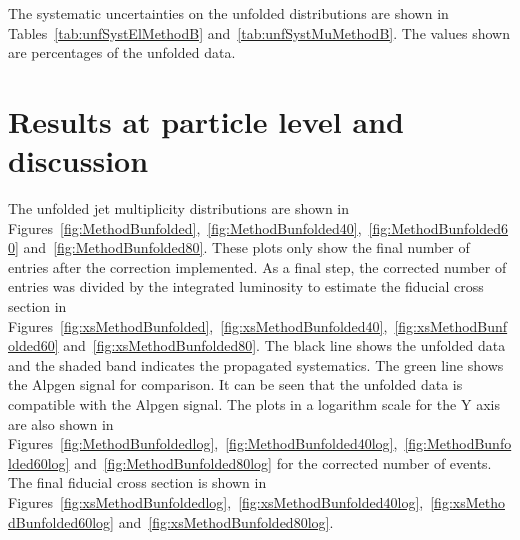 The systematic uncertainties on the unfolded distributions are shown
in Tables~\ref{tab:unfSystElMethodB} and~\ref{tab:unfSystMuMethodB}.
The values shown are percentages of the unfolded data.




\section{Results at particle level and discussion}
\label{sec:ttjets_unfolded}

The unfolded jet multiplicity distributions are shown in
Figures~\ref{fig:MethodBunfolded},~\ref{fig:MethodBunfolded40},~\ref{fig:MethodBunfolded60} and~\ref{fig:MethodBunfolded80}. These plots only
show the final number of entries after the correction implemented.
As a final step, the corrected number of entries was divided by the
integrated luminosity to estimate the fiducial cross section in
Figures~\ref{fig:xsMethodBunfolded},~\ref{fig:xsMethodBunfolded40},~\ref{fig:xsMethodBunfolded60} and~\ref{fig:xsMethodBunfolded80}.
The black line shows the unfolded data and the shaded band indicates the
propagated systematics. The green line shows the Alpgen \ttbar signal for
comparison. 
It can be seen that the unfolded data is compatible with the Alpgen \ttbar
signal.
The plots in a logarithm scale for the Y axis are also shown in Figures~\ref{fig:MethodBunfoldedlog},~\ref{fig:MethodBunfolded40log},~\ref{fig:MethodBunfolded60log} and~\ref{fig:MethodBunfolded80log} for the corrected number
of events. The final fiducial cross section is shown in Figures~\ref{fig:xsMethodBunfoldedlog},~\ref{fig:xsMethodBunfolded40log},~\ref{fig:xsMethodBunfolded60log} and~\ref{fig:xsMethodBunfolded80log}.

\begin{sidewaysfigure}[htbp]
\centering
{}
\caption{The unfolded data using the Alpgen  \ttbar\ signal sample for corrections.  The results for
  the electron (left) and muon (right) channels are shown. The systematic
  uncertainties from reconstruction and background estimation are
  included. The $p_T$ cut on the jets is 25~GeV.}
\label{fig:MethodBunfolded}
\end{sidewaysfigure}

